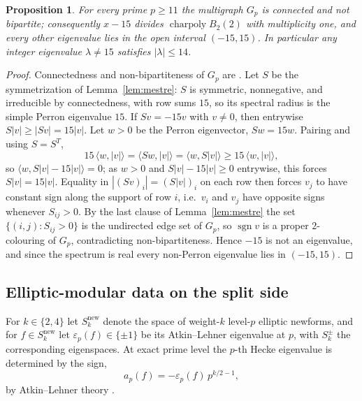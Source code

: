 \documentclass[10pt,a4paper]{amsart}
\newtheorem{proposition}[theorem]{Proposition}
\newcommand{\snew}{S^{\mathrm{new}}}
\newcommand{\eps}{\varepsilon}
\DeclareMathOperator{\charp}{charpoly}
\providecommand{\snew}{S^{\mathrm{new}}}
\providecommand{\charp}{\operatorname{charpoly}}
\begin{document}
	\begin{proposition}\label{prop:frame}
		For every prime $p\ge11$ the multigraph $G_p$ is connected and not
		bipartite; consequently $x-15$ divides $\charp B_2(2)$ with multiplicity
		one, and every other eigenvalue lies in the open interval $(-15,15)$. In
		particular any integer eigenvalue $\lambda\ne15$ satisfies
		$|\lambda|\le14$.
	\end{proposition}
	
	\begin{proof}
		Connectedness and non-bipartiteness of $G_p$ are
		\cite[Thm.~44]{JordanZaytman}. Let $S$ be the symmetrization of
		Lemma~\ref{lem:mestre}: $S$ is symmetric, nonnegative, and irreducible by
		connectedness, with row sums $15$, so its spectral radius is the simple
		Perron eigenvalue $15$. If $Sv=-15v$ with $v\ne0$, then entrywise
		$S|v|\ge|Sv|=15|v|$. Let $w>0$ be the Perron eigenvector, $Sw=15w$.
		Pairing and using $S=S^{T}$,
		\[
		15\,\langle w,|v|\rangle=\langle Sw,|v|\rangle=\langle w,S|v|\rangle
		\ge15\,\langle w,|v|\rangle,
		\]
		so $\langle w,S|v|-15|v|\rangle=0$; as $w>0$ and $S|v|-15|v|\ge0$
		entrywise, this forces $S|v|=15|v|$. Equality in $|(Sv)_i|=(S|v|)_i$ on
		each row then forces $v_j$ to have constant sign along the support of row
		$i$, i.e.\ $v_i$ and $v_j$ have opposite signs whenever $S_{ij}>0$. By the
		last clause of Lemma~\ref{lem:mestre} the set $\{(i,j):S_{ij}>0\}$ is the
		undirected edge set of $G_p$, so $\operatorname{sgn}v$ is a proper
		$2$-colouring of $G_p$, contradicting non-bipartiteness. Hence $-15$ is
		not an eigenvalue, and since the spectrum is real every non-Perron
		eigenvalue lies in $(-15,15)$.
	\end{proof}
	
	\subsection{Elliptic-modular data on the split side}
	\label{ss:split}
	
	For $k\in\{2,4\}$ let $\snew_k$ denote the space of weight-$k$ level-$p$
	elliptic newforms, and for $f\in\snew_k$ let $\eps_p(f)\in\{\pm1\}$ be its
	Atkin--Lehner eigenvalue at $p$, with $S_k^{\pm}$ the corresponding
	eigenspaces. At exact prime level the $p$-th Hecke eigenvalue is determined
	by the sign,
	\begin{equation}\label{eq:ap-sign}
		a_p(f)=-\eps_p(f)\,p^{k/2-1},
	\end{equation}
	by Atkin--Lehner theory \cite[Thm.~3]{AtkinLehner}.
	
\end{document}
